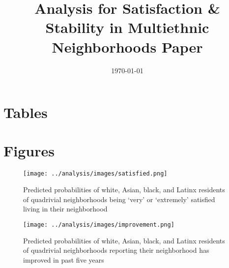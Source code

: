 \documentclass[]{baderart}
\title{Analysis for Satisfaction \& Stability in Multiethnic Neighborhoods Paper}
\date{\today}
\begin{document}
\maketitle

\section{Tables}
















\clearpage
\section{Figures}

\begin{figure}[h!]
\centering
\caption{Predicted probabilities of white, Asian, black, and Latinx residents of quadrivial neighborhoods being `very' or `extremely' satisfied living in their neighborhood}
\texttt{[image: ../analysis/images/satisfied.png]}
\end{figure}

\begin{figure}[h!]
\centering
\caption{Predicted probabilities of white, Asian, black, and Latinx residents of quadrivial neighborhoods reporting their neighborhood has improved in past five years}
\texttt{[image: ../analysis/images/improvement.png]}
\end{figure}
\end{document}
